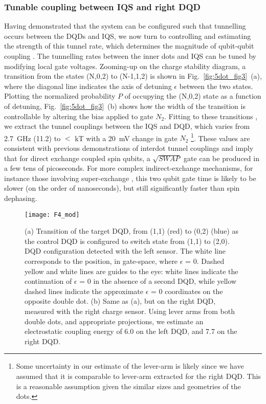 \subsubsection{Tunable coupling between IQS and right DQD}
Having demonstrated that the system can be configured such that tunnelling occurs between the DQDs and IQS, we now turn to controlling and estimating the strength of this tunnel rate, which determines the magnitude of qubit-qubit coupling \cite{bluhm,superexchange,srinivasa}. The tunnelling rates between the inner dots and IQS can be tuned by modifying local gate voltages. Zooming-up on the charge stability diagram, a transition from the states (N,0,2) to (N-1,1,2) is shown in Fig.~\ref{fig:5dot_fig3}~(a), where the diagonal line indicates the axis of detuning $\epsilon$ between the two states. Plotting the normalized probability $P$ of occupying the (N,0,2) state as a function of detuning, Fig.~\ref{fig:5dot_fig3}~(b) shows how the width of the transition is controllable by altering the bias applied to gate $N_2$. Fitting to these transitions \cite{dicarlo}, we extract the tunnel couplings between the IQS and DQD, which varies from \SI{2.7}{\giga\hertz} (\SI{11.2}{\uev}) to $<$ kT with a \SI{20}{\milli\volt} change in gate $N_2$ \footnote{Some uncertainty in our estimate of the lever-arm is likely since we have assumed that it is comparable to lever-arm extracted for the right DQD. This is a reasonable assumption given the similar sizes and geometries of the dots.}. These values are consistent with previous demonstrations of interdot tunnel couplings \cite{superexchange,petta} and imply that for direct exchange coupled spin qubits, a $\sqrt{SWAP}$ gate can be produced in a few tens of picoseconds. For more complex indirect-exchange mechanisms, for instance those involving super-exchange \cite{bluhm,superexchange}, this two qubit gate time is likely to be slower (on the order of nanoseconds), but still significantly faster than spin dephasing. 

\begin{figure}
\texttt{[image: F4\_mod]}
\caption{\label{fig:5dot_fig4} (a) Transition of the target DQD, from (1,1) (red) to (0,2) (blue) as the control DQD is configured to switch state from (1,1) to (2,0). DQD configuration detected with the left sensor. The white line corresponds to the position, in gate-space, where $\epsilon$ = 0. Dashed yellow and white lines are guides to the eye: white lines indicate the continuation of $\epsilon$ = 0 in the absence of a second DQD, while yellow dashed lines indicate the approximate $\epsilon$ = 0 coordinates on the opposite double dot.  (b)  Same as (a), but on the right DQD, measured with the right charge sensor. Using lever arms from both double dots, and appropriate projections, we estimate an electrostatic coupling energy of \SI{6.0}{\uev} on the left DQD, and \SI{7.7}{\uev} on the right DQD.}
\end{figure}

